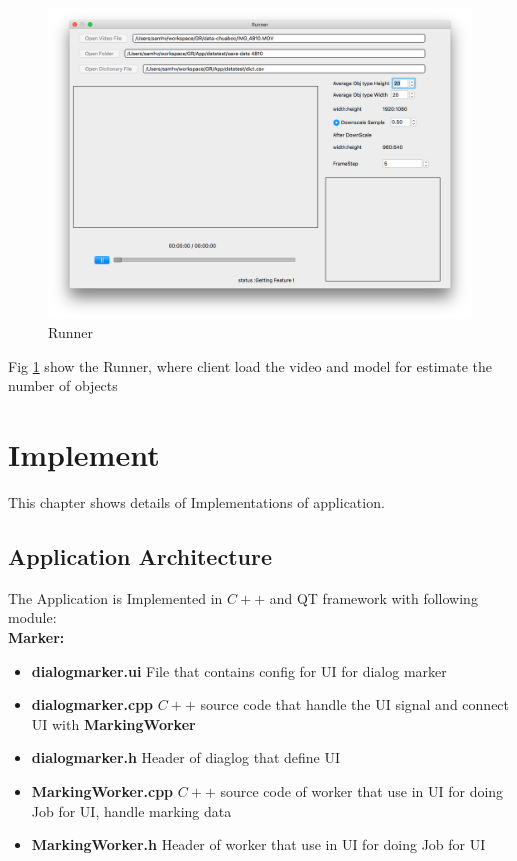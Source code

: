 \begin{center}
    \begin{figure}[H]
      \includegraphics[width=\textwidth]{Chapters/Fig/Runner}
      \caption{Runner}
      \label{fig:Runner}
  \end{figure}
\end{center}
Fig \ref{fig:Runner} show the Runner, where client load the video and model for estimate the number of objects \\


\section{Implement}
This chapter shows details of Implementations of application. \\
\subsection{Application Architecture}

The Application is Implemented in $C++$ and QT framework with following module:\\
\textbf{Marker: }
\begin{itemize}
  \item \textbf{dialogmarker.ui} File that contains config for UI for dialog marker
  \item \textbf{dialogmarker.cpp} $C++$ source code that handle the UI signal and connect UI with \textbf{MarkingWorker}
  \item \textbf{dialogmarker.h} Header of diaglog that define UI
  \item \textbf{MarkingWorker.cpp} $C++$ source code of worker that use in UI for doing Job for UI, handle marking data
  \item \textbf{MarkingWorker.h} Header of worker that use in UI for doing Job for UI
\end{itemize}

